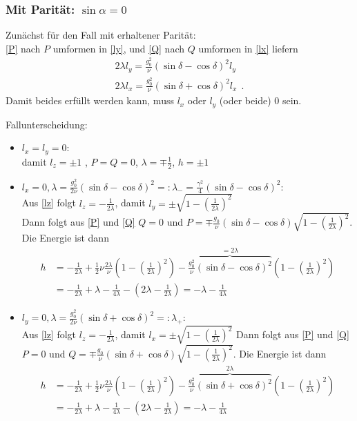 \subsubsection{ Mit Parität: $\sin\alpha = 0$}
Zunächst für den Fall mit erhaltener Parität:\\
\eqref{P} nach $P$ umformen in \eqref{ly}, und \eqref{Q} nach $Q$ umformen in \eqref{lx} liefern
\begin{align*}
  2\lambda l_y = \frac{g_0^2}{\nu}(\sin\delta - \cos\delta)^2 l_y\\
  2\lambda l_x = \frac{g_0^2}{\nu}(\sin\delta + \cos\delta)^2 l_x~~.
\end{align*}
Damit beides erfüllt werden kann, muss $l_x$ oder $l_y$ (oder beide) $0$ sein.

Fallunterscheidung:
\begin{itemize}
 \item $l_x=l_y=0$:\\
 damit $l_z=\pm1$ , $P=Q=0$,  $\lambda = \mp \frac{1}{2}$, $h=\pm 1$
\item $l_x=0, \lambda = \frac{g_0^2}{2\nu}(\sin\delta - \cos\delta)^2 =:\lambda_- = \frac{\gamma^2}{4}(\sin\delta - \cos\delta)^2$:\\
Aus \eqref{lz} folgt $l_z = -\frac{1}{2\lambda}$, damit $l_y = \pm \sqrt{1-(\frac{1}{2\lambda})^2}$\\
Dann folgt aus \eqref{P} und \eqref{Q} $Q=0$ und $P=\mp \frac{g_0}{\nu}(\sin\delta - \cos\delta) \sqrt{1-(\frac{1}{2\lambda})^2}$.
Die Energie ist dann
\begin{align*}
  h &= -\frac{1}{2\lambda}  + \frac{1}{2} \nu \frac{2\lambda}{\nu}\left(1-(\frac{1}{2\lambda})^2\right) 
- \overbrace{\frac{g_0^2}{\nu} (\sin\delta-\cos\delta)^2}^{ = 2\lambda}\left(1-(\frac{1}{2\lambda})^2\right)\\ 
  &= -\frac{1}{2\lambda} + \lambda -\frac{1}{4\lambda} - (2\lambda -\frac{1}{2\lambda})=-\lambda -\frac{1}{4\lambda}
\end{align*}
\item $l_y=0, \lambda = \frac{g_0^2}{2\nu}(\sin\delta + \cos\delta)^2 =:\lambda_+$:\\
Aus \eqref{lz} folgt $l_z = -\frac{1}{2\lambda}$, damit $l_x = \pm \sqrt{1-(\frac{1}{2\lambda})^2}$
Dann folgt aus \eqref{P} und \eqref{Q} $P=0$ und $Q=\mp \frac{g_0}{\nu}(\sin\delta + \cos\delta)\sqrt{1-(\frac{1}{2\lambda})^2}$.
Die Energie ist dann
\begin{align*}
  h &= -\frac{1}{2\lambda}  + \frac{1}{2} \nu \frac{2\lambda}{\nu}\left(1-(\frac{1}{2\lambda})^2\right) 
- \overbrace{\frac{g_0^2}{\nu} (\sin\delta+\cos\delta)^2 }^{2\lambda}\left(1-(\frac{1}{2\lambda})^2\right)\\ 
  &= -\frac{1}{2\lambda} + \lambda -\frac{1}{4\lambda} - (2\lambda -\frac{1}{2\lambda})=-\lambda -\frac{1}{4\lambda}
\end{align*}
\end{itemize}
